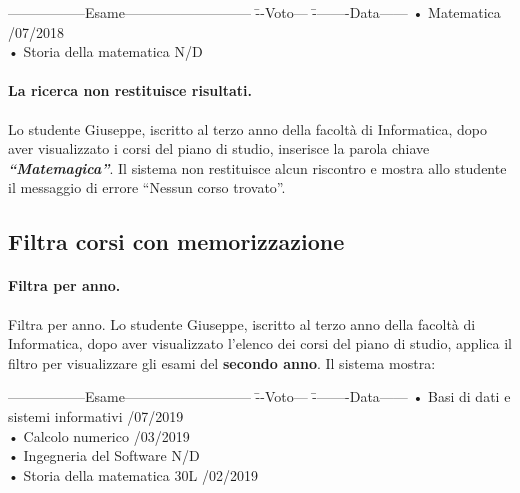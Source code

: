\begin{tabbing}
	\hspace{1cm}-----------------Esame--------------------------- \= --Voto--- \= --------Data------ \kill
	\hspace{1cm} • Matematica  /07/2018 \\
	\hspace{1cm} • Storia della matematica \> N/D \>\\
\end{tabbing}

\paragraph{La ricerca non restituisce risultati.} 
Lo studente Giuseppe, iscritto al terzo anno della facoltà di Informatica, dopo aver visualizzato i corsi del piano di studio, inserisce la parola chiave \textbf{\textit{“Matemagica”}}. Il sistema non restituisce alcun riscontro e mostra allo studente il messaggio di errore “Nessun corso trovato”.

\subsection{Filtra corsi con memorizzazione }
\paragraph{Filtra per anno.} 
Filtra per anno. Lo studente Giuseppe, iscritto al terzo anno della facoltà di Informatica, dopo aver visualizzato l’elenco dei corsi del piano di studio, applica il filtro per visualizzare gli esami del \textbf{secondo anno}. Il sistema mostra:

\begin{tabbing}
	\hspace{1cm}-----------------Esame--------------------------- \= --Voto--- \= --------Data------ \kill
	\hspace{1cm} • Basi di dati e sistemi informativi  /07/2019 \\
	\hspace{1cm} • Calcolo numerico  /03/2019 \\
	\hspace{1cm} • Ingegneria del Software\> N/D \> \\
	\hspace{1cm} • Storia della matematica \> 30L /02/2019 \\
\end{tabbing}

